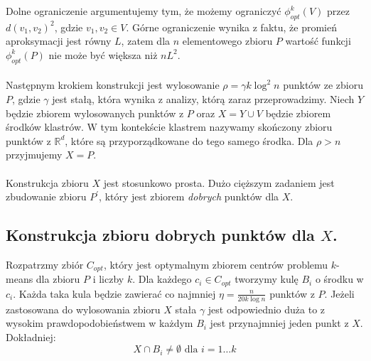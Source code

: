 Dolne ograniczenie argumentujemy tym, że możemy ograniczyć $\phi_{opt}^{k}(V)$ przez $d(v_{1}, v_{2})^2$, gdzie $v_{1}, v_{2} \in V$.
Górne ograniczenie wynika z faktu, że promień aproksymacji jest równy $L$, zatem dla $n$ elementowego zbioru $P$ wartość funkcji $\phi_{opt}^{k}(P)$ nie może być większa niż $nL^2$.
\\~\\
Następnym krokiem konstrukcji jest wylosowanie $\rho = \gamma k \log^{2} n$ punktów ze zbioru $P$, gdzie $\gamma$ jest stałą, która wynika z analizy, którą zaraz przeprowadzimy.
Niech $Y$ będzie zbiorem wylosowanych punktów z $P$ oraz $X = Y \cup V$ będzie zbiorem środków klastrów.
W tym kontekście klastrem nazywamy skończony zbioru punktów z $\mathbb{R}^{d}$, które są przyporządkowane do tego samego środka.
Dla $\rho > n$ przyjmujemy $X = P$.
\\~\\
Konstrukcja zbioru $X$ jest stosunkowo prosta.
Dużo cięższym zadaniem jest zbudowanie zbioru $P^{'}$, który jest zbiorem \textit{dobrych} punktów dla $X$.

\subsection{Konstrukcja zbioru dobrych punktów dla $X$.}

Rozpatrzmy zbiór $C_{opt}$, który jest optymalnym zbiorem centrów problemu $k$-means dla zbioru $P$ i liczby $k$.
Dla każdego $c_{i} \in C_{opt}$ tworzymy kulę $B_{i}$ o środku w $c_{i}$.
Każda taka kula będzie zawierać co najmniej $\eta = \frac{n}{20k \log n}$ punktów z $P$.
Jeżeli zastosowana do wylosowania zbioru $X$ stała $\gamma$ jest odpowiednio duża to z wysokim prawdopodobieństwem w każdym $B_{i}$ jest przynajmniej jeden punkt z $X$.
Dokładniej:
\begin{equation}
    X \cap B_{i} \neq \emptyset \text{ dla } i = 1 \dots k
\end{equation}


